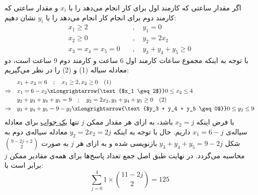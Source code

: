 \p
اگر مقدار ساعتی که کارمند اول برای کار 
انجام می‌دهد را با $x_i$ و مقدار ساعتی که کارمند دوم برای انجام کار
انجام می‌دهد را با $y_i$
نشان ‌دهیم:
\begin{align*}
 x_1 \geq 2 \quad &, \quad y_1 = 0 \\
 x_2 \geq 0 \quad &, \quad y_2 = 2x_2 \\
 x_3=x_4=x_5=0 \quad &, \quad y_3  + y_4 + y_5 \geq 0 
\end{align*}
\p
با توجه به اینکه 
مجموع ساعات کارمند اول 6 ساعت و کارمند دوم 9 ساعت است، دو معادله سیاله 
(1) 
و
(2)
 را در نظر می‌گیریم:
\begin{align*}
&x_1 + x_2  = 6 \quad ;\quad x_1 \geq 2 , x_2 \geq  0 \quad (1)\\
 \Rightarrow \quad  &x_1 = 6 - x_2 \xLongrightarrow{\text{$x_1 \geq 2$}}  0 \leq x_2 \leq 4  \\
&y_2 + y_3 + y_4 + y_5 = 9\quad ;\quad y_2 = 2x_2 , y_3 + y_4 + y_5  \geq 0\quad (2)\\
 \Rightarrow\quad &y_3 + y_4 + y_5 = 9 - y_2 \xLongrightarrow{\text{$y_3 + y_4 + y_5  \geq 0$}} 0 \leq y_2 \leq 9 
\end{align*}
\p
با فرض اینکه
$x_2 = j$
باشد،
به ازای هر مقدار ممکن  
$j$
تنها
\underline{یک جواب}
برای
معادله سیاله‌ی 
 $x_1 = 6 - j$
 داریم.
 حال با توجه به اینکه 
 $y_2 = 2x_2 = 2j$
 معادله‌ سیاله‌ی دوم به شكل 
 $y_3 + y_4 + y_5 = 9 - 2j$
 بازنویسی شده و به ازای هر 
 $j$
 به صورت
 \underline{ $\binom{9 - 2j + 2}{2}$}
 محاسبه می‌گردد.
\p
در نهایت طبق اصل جمع تعداد پاسخ‌ها برای همه‌ی مقادیر ممکن 
$j$
برابر است با: 
$$\sum_{j=0}^{4} 1 \times\binom{11 - 2j}{2} = 125$$
